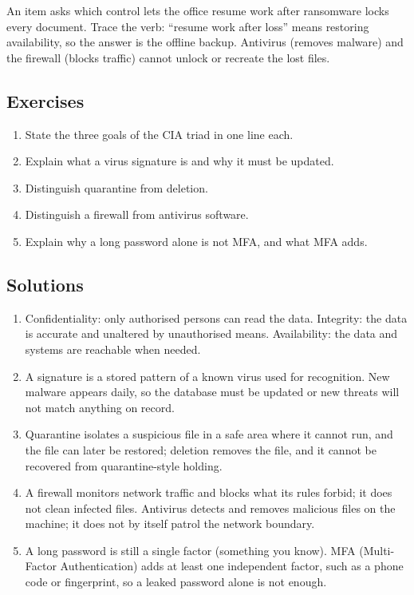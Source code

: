 \begin{example}
An item asks which control lets the office resume work after ransomware locks
every document. Trace the verb: ``resume work after loss'' means restoring
availability, so the answer is the offline backup. Antivirus (removes malware)
and the firewall (blocks traffic) cannot unlock or recreate the lost files.
\end{example}

\subsection*{Exercises}
\begin{enumerate}[label=\arabic*.]
  \item State the three goals of the CIA triad in one line each.
  \item Explain what a virus signature is and why it must be updated.
  \item Distinguish quarantine from deletion.
  \item Distinguish a firewall from antivirus software.
  \item Explain why a long password alone is not MFA, and what MFA adds.
\end{enumerate}

\subsection*{Solutions}
\begingroup\small
\begin{enumerate}[label=\arabic*.]
  \item Confidentiality: only authorised persons can read the data.
    Integrity: the data is accurate and unaltered by unauthorised means.
    Availability: the data and systems are reachable when needed.
  \item A signature is a stored pattern of a known virus used for recognition.
    New malware appears daily, so the database must be updated or new threats
    will not match anything on record.
  \item Quarantine isolates a suspicious file in a safe area where it cannot
    run, and the file can later be restored; deletion removes the file, and
    it cannot be recovered from quarantine-style holding.
  \item A firewall monitors network traffic and blocks what its rules forbid;
    it does not clean infected files. Antivirus detects and removes malicious
    files on the machine; it does not by itself patrol the network boundary.
  \item A long password is still a single factor (something you know). MFA
    (Multi-Factor Authentication) adds at least one independent factor, such
    as a phone code or fingerprint, so a leaked password alone is not enough.
\end{enumerate}
\endgroup

